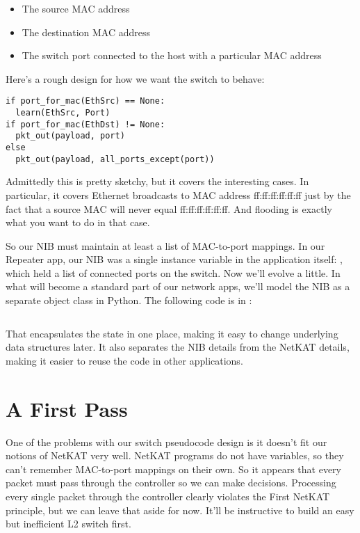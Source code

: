 \begin{itemize}
\item The source MAC address
\item The destination MAC address
\item The switch port connected to the host with a particular MAC address
\end{itemize}

Here's a rough design for how we want the switch to behave:

\begin{verbatim}
if port_for_mac(EthSrc) == None:
  learn(EthSrc, Port)
if port_for_mac(EthDst) != None:
  pkt_out(payload, port)
else
  pkt_out(payload, all_ports_except(port))
\end{verbatim}

Admittedly this is pretty sketchy, but it covers the interesting cases.  In particular, it covers
Ethernet broadcasts to MAC address ff:ff:ff:ff:ff:ff just by the fact that a source MAC will never
equal ff:ff:ff:ff:ff:ff.  And flooding is exactly what you want to do in that case.

So our NIB must maintain at least a list of MAC-to-port mappings.  
In our Repeater app, our NIB was a single instance variable in the application itself:
, which held a list of connected ports on the switch.  
Now we'll evolve a little.
In what will become a standard
part of our network apps, we'll model the NIB as a separate object class in Python.  
The following code is in :

\inputminted{python}{code/l2_learning_switch/network_information_base.py}

That 
encapsulates the state in one place, making it easy to change underlying data structures later.
It also separates the NIB details from the NetKAT details, making it easier to reuse the code
in other applications.  

\section{A First Pass}

One of the problems with our switch pseudocode design is it doesn't fit our notions of NetKAT very well.
NetKAT programs do not have variables, so they can't remember MAC-to-port mappings on their own.
So it appears that every packet must pass through the controller so we can make decisions.
Processing every single packet through the controller clearly violates the First NetKAT principle, but
we can leave that aside for now.  It'll be instructive to build an easy but inefficient L2 switch first.

